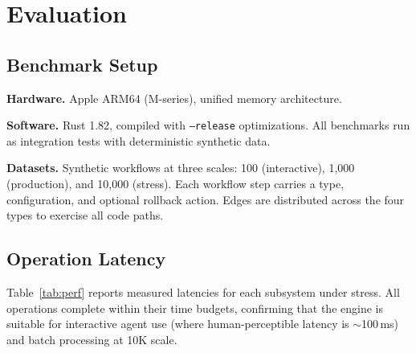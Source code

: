 \documentclass[10pt, twocolumn]{article}
\begin{document}
\section{Evaluation}\label{sec:evaluation}

\subsection{Benchmark Setup}\label{sec:setup}

\textbf{Hardware.} Apple ARM64 (M-series), unified memory architecture.

\textbf{Software.} Rust 1.82, compiled with \texttt{--release} optimizations. All benchmarks run as integration tests with deterministic synthetic data.

\textbf{Datasets.} Synthetic workflows at three scales: 100 (interactive), 1{,}000 (production), and 10{,}000 (stress). Each workflow step carries a type, configuration, and optional rollback action. Edges are distributed across the four types to exercise all code paths.

\subsection{Operation Latency}\label{sec:latency}

Table~\ref{tab:perf} reports measured latencies for each subsystem under stress. All operations complete within their time budgets, confirming that the engine is suitable for interactive agent use (where human-perceptible latency is $\sim$100\,ms) and batch processing at 10K scale.
\end{document}
